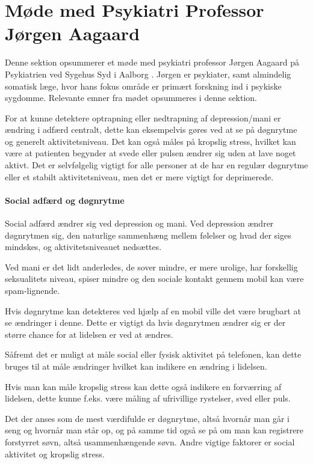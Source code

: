 \section{Møde med Psykiatri Professor Jørgen Aagaard}\label{sec:moede-med-joergen}
Denne sektion opsummerer et møde med psykiatri professor Jørgen Aagaard på Psykiatrien ved Sygehus Syd i Aalborg \citep{misc:jorgen-aagaard}. 
Jørgen er psykiater, samt almindelig somatisk læge, hvor hans fokus område er primært forskning ind i psykiske sygdomme.
Relevante emner fra mødet opsummeres i denne sektion.

For at kunne detektere optrapning eller nedtrapning af depression/mani er ændring i adfærd centralt, dette kan eksempelvis gøres ved at se på døgnrytme og generelt aktivitetsniveau. 
Det kan også måles på kropslig stress, hvilket kan være at patienten begynder at svede eller pulsen ændrer sig uden at lave noget aktivt. 
Det er selvfølgelig vigtigt for alle personer at de har en regulær døgnrytme eller et stabilt aktivitetsniveau, men det er mere vigtigt for deprimerede.

\paragraph{Social adfærd og døgnrytme}
Social adfærd ændrer sig ved depression og mani.
Ved depression ændrer døgnrytmen sig, den naturlige sammenhæng mellem følelser og hvad der siges mindskes, og aktivitetsniveauet nedsættes.

Ved mani er det lidt anderledes, de sover mindre, er mere urolige, har forskellig seksualitets niveau, spiser mindre og den sociale kontakt gennem mobil kan være spam-lignende. 

Hvis døgnrytme kan detekteres ved hjælp af en mobil ville det være brugbart at se ændringer i denne.
Dette er vigtigt da hvis døgnrytmen ændrer sig er der større chance for at lidelsen er ved at ændres.

Såfremt det er muligt at måle social eller fysisk aktivitet på telefonen, kan dette bruges til at måle ændringer hvilket kan indikere en ændring i lidelsen.

Hvis man kan måle kropslig stress kan dette også indikere en forværring af lidelsen, dette kunne f.eks. være måling af ufrivillige rystelser, sved eller puls. 

Det der anses som de mest værdifulde er døgnrytme, altså hvornår man går i seng og hvornår man står op, og på samme tid også se på om man kan registrere forstyrret søvn, altså usammenhængende søvn. 
Andre vigtige faktorer er social aktivitet og kropslig stress.

